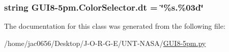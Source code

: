 \subsubsection[{\texorpdfstring{dt}{dt}}]{\setlength{\rightskip}{0pt plus 5cm}string G\+U\+I8-\/5pm.\+Color\+Selector.\+dt = \char`\"{}\%s.\%03d\char`\"{}\hspace{0.3cm}{\ttfamily [static]}}\hypertarget{classGUI8-5pm_1_1ColorSelector_a757632868adf77e3170d9d45d69e2ef9}{}\label{classGUI8-5pm_1_1ColorSelector_a757632868adf77e3170d9d45d69e2ef9}


The documentation for this class was generated from the following file\+:\begin{DoxyCompactItemize}
\item 
/home/jac0656/\+Desktop/\+J-\/\+O-\/\+R-\/\+G-\/\+E/\+U\+N\+T-\/\+N\+A\+S\+A/\hyperlink{GUI8-5pm_8py}{G\+U\+I8-\/5pm.\+py}\end{DoxyCompactItemize}
